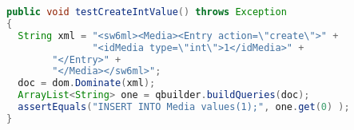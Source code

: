 \begin{Code}
\begin{lstlisting}[label=code:testCase,language=java,caption=A JUnit test case]
public void testCreateIntValue() throws Exception
{
  String xml = "<sw6ml><Media><Entry action=\"create\">" +
               "<idMedia type=\"int\">1</idMedia>" +
		"</Entry>" +
		"</Media></sw6ml>";
  doc = dom.Dominate(xml);
  ArrayList<String> one = qbuilder.buildQueries(doc);
  assertEquals("INSERT INTO Media values(1);", one.get(0) );	
}
\end{lstlisting}
\end{Code}

